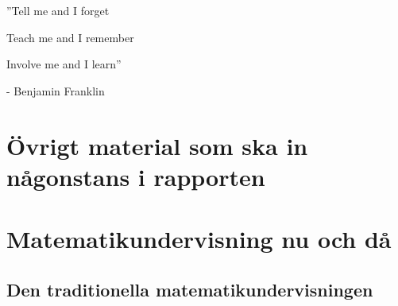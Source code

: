 \documentclass[11pt,a4paper]{article}
\begin{document}



\newpage

\begin{centering}
\Huge
''Tell me and I forget 

Teach me and I remember

Involve me and I learn''

\end{centering}
\bigskip
\begin{centering}

\Large
- Benjamin Franklin

\end{centering}
\newpage

\renewcommand\abstractname{Sammandrag}\begin{abstract}

\end{abstract}

\newpage

\renewcommand\abstractname{Abstract}
\begin{abstract} 

\end{abstract}

\newpage
 
\tableofcontents

\newpage
{}

\section*{Övrigt material som ska in någonstans i rapporten}
    

\section{Matematikundervisning nu och då}
    
    \label{sec:Bakgrund}
    
    
    \subsection{Den traditionella matematikundervisningen}
        \label{sec:MatteForr.tex}
        
        
\end{document}
